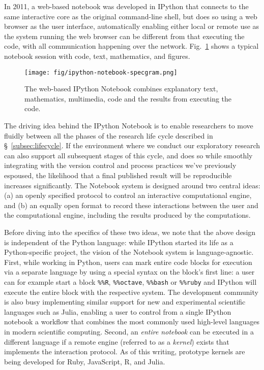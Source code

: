 \documentclass[11pt,oneside,english]{article}
\begin{document}
In 2011, a web-based notebook was developed in IPython that connects to the
same interactive core as the original command-line shell, but does so using a
web browser as the user interface, automatically enabling either local or
remote use as the system running the web browser can be different from that
executing the code, with all communication happening over the network.
Fig.~\ref{fig:IPython-notebook} shows a typical notebook session with code,
text, mathematics, and figures.

\begin{figure}
  \begin{centering}
    \texttt{[image: fig/ipython-notebook-specgram.png]}\par
  \end{centering}

  \caption{\label{fig:IPython-notebook}The web-based IPython Notebook combines
    explanatory text, mathematics, multimedia, code and the results from
    executing the code.}
\end{figure}

The driving idea behind the IPython Notebook is to enable researchers to move
fluidly between all the phases of the research life cycle described in
§~\ref{subsec:lifecycle}.  If the environment where we conduct our
exploratory research can also support all subsequent stages of this cycle, and
does so while smoothly integrating with the version control and process
practices we've previously espoused, the likelihood that a final published
result will be reproducible increases significantly.  The Notebook system is
designed around two central ideas: (a) an openly specified protocol to control
an interactive computational engine, and (b) an equally open format to record
these interactions between the user and the computational engine, including the
results produced by the computations.

Before diving into the specifics of these two ideas, we note that the above
design is independent of the Python language: while IPython started its life as
a Python-specific project, the vision of the Notebook system is
language-agnostic.  First, while working in Python, users can mark entire code
blocks for execution via a separate language by using a special syntax on the
block's first line: a user can for example start a block \texttt{\%\%R},
\texttt{\%\%octave}, \texttt{\%\%bash} or \texttt{\%\%ruby} and IPython will
execute the entire block with the respective system.  The development community
is also busy implementing similar support for new and experimental
scientific languages such as Julia, enabling a user to control from a single
IPython notebook a workflow that combines the most commonly used high-level
languages in modern scientific computing.  Second, an \emph{entire notebook}
can be executed in a different language if a remote engine (referred to as a
\emph{kernel}) exists that implements the interaction protocol.  As of this
writing, prototype kernels are being developed for Ruby, JavaScript, R, and
Julia.
\end{document}
